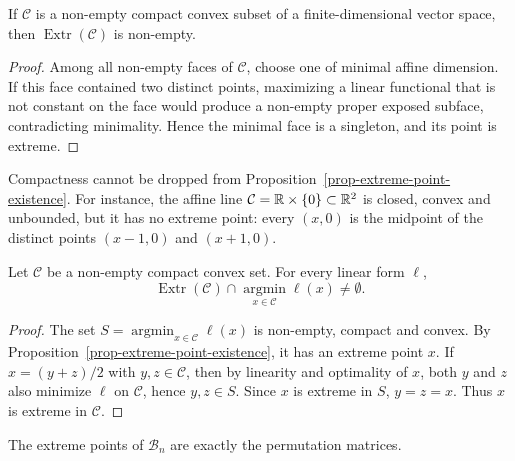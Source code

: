 \begin{prop}\label{prop-extreme-point-existence}
	If $\mathcal C$ is a non-empty compact convex subset of a finite-dimensional vector space, then $\operatorname{Extr}(\mathcal C)$ is non-empty.
\end{prop}
\begin{proof}
	Among all non-empty faces of $\mathcal C$, choose one of minimal affine dimension. If this face contained two distinct points, maximizing a linear functional that is not constant on the face would produce a non-empty proper exposed subface, contradicting minimality. Hence the minimal face is a singleton, and its point is extreme.
\end{proof}

\begin{example}
		Compactness cannot be dropped from Proposition~\ref{prop-extreme-point-existence}. For instance, the affine line $\mathcal C=\mathbb{R}\times\{0\}\subset\mathbb{R}^2$ is closed, convex and unbounded, but it has no extreme point: every $(x,0)$ is the midpoint of the distinct points $(x-1,0)$ and $(x+1,0)$.
\end{example}

\begin{prop}\label{prop-linear-program-extreme-minimizer}
		Let $\mathcal C$ be a non-empty compact convex set. For every linear form $\ell$,
	\[
		\operatorname{Extr}(\mathcal C)\cap\operatorname*{argmin}_{x\in\mathcal C}\ell(x)
		\neq\emptyset.
	\]
\end{prop}
\begin{proof}
	The set $S=\operatorname*{argmin}_{x\in\mathcal C}\ell(x)$ is non-empty, compact and convex. By Proposition~\ref{prop-extreme-point-existence}, it has an extreme point $x$. If $x=(y+z)/2$ with $y,z\in\mathcal C$, then by linearity and optimality of $x$, both $y$ and $z$ also minimize $\ell$ on $\mathcal C$, hence $y,z\in S$. Since $x$ is extreme in $S$, $y=z=x$. Thus $x$ is extreme in $\mathcal C$.
\end{proof}

\begin{thm}\label{thm-birkhoff-von-neumann}
	The extreme points of $\mathcal B_n$ are exactly the permutation matrices.
\end{thm}

